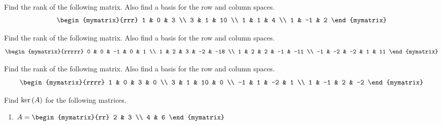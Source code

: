 \begin{enumialphparenastyle}
\begin{ex} Find the rank of the following matrix. Also find a basis for the row
and column spaces. 
\begin{equation*}
\begin{mymatrix}{rrr}
1 & 0 & 3 \\ 
3 & 1 & 10 \\ 
1 & 1 & 4 \\ 
1 & -1 & 2
\end{mymatrix}
\end{equation*}
\end{ex}

\begin{ex} Find the rank of the following matrix. Also find a basis for the row
and column spaces. 
\begin{equation*}
\begin{mymatrix}{rrrrr}
0 & 0 & -1 & 0 & 1 \\ 
1 & 2 & 3 & -2 & -18 \\ 
1 & 2 & 2 & -1 & -11 \\ 
-1 & -2 & -2 & 1 & 11
\end{mymatrix}
\end{equation*}
\end{ex}

\begin{ex} Find the rank of the following matrix. Also find a basis for the row
and column spaces.
\begin{equation*}
\begin{mymatrix}{rrrr}
1 & 0 & 3 & 0 \\ 
3 & 1 & 10 & 0 \\ 
-1 & 1 & -2 & 1 \\ 
1 & -1 & 2 & -2
\end{mymatrix}
\end{equation*}
\end{ex}

\begin{ex} Find $\ker \left(A \right)$ for the following matrices. 

\begin{enumerate}
\item 
$A = \begin{mymatrix}{rr}
2 & 3 \\
4 & 6 
\end{mymatrix} $


\end{enumerate}
\end{ex}
\end{enumialphparenastyle}
